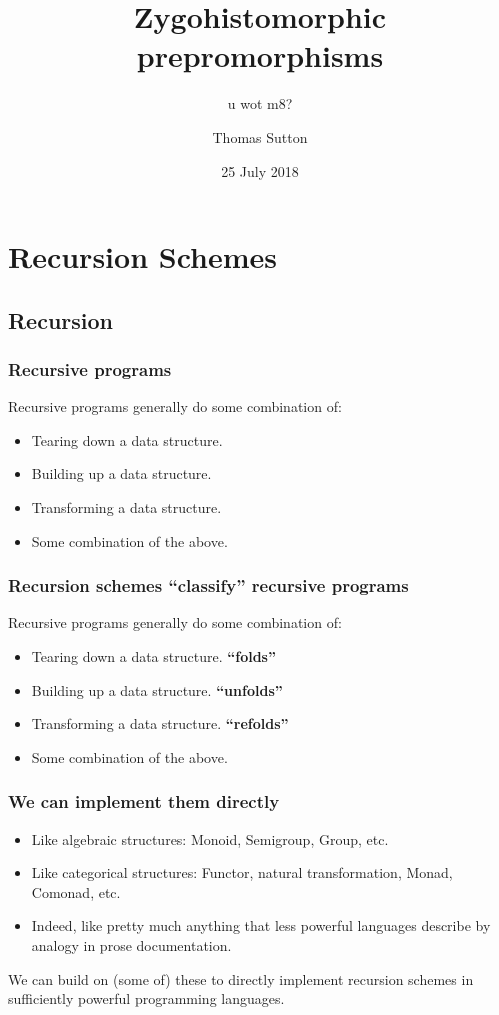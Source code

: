 \documentclass{beamer}
\title{Zygohistomorphic prepromorphisms}
\author{Thomas Sutton}
\institute{Simple Machines}
\date{25 July 2018}
\begin{document}
\begin{frame}
\titlepage
\end{frame}

\subtitle{u wot m8?}

\begin{frame}
\titlepage
\end{frame}


\section{Recursion Schemes}

\subsection{Recursion}

\begin{frame}
\frametitle{Recursive programs}

Recursive programs generally do some combination of:

\begin{itemize}
\item Tearing down a data structure.
\item Building up a data structure.
\item Transforming a data structure.
\item Some combination of the above.
\end{itemize}
\end{frame}

\begin{frame}
\frametitle{Recursion schemes ``classify'' recursive programs}

Recursive programs generally do some combination of:

\begin{itemize}
\item Tearing down a data structure. {\bf ``folds''}
\item Building up a data structure. {\bf ``unfolds''}
\item Transforming a data structure. {\bf ``refolds''}
\item Some combination of the above.
\end{itemize}
\end{frame}

\begin{frame}
\frametitle{We can implement them directly}

\begin{itemize}
\item Like algebraic structures: Monoid, Semigroup, Group, etc.

\item Like categorical structures: Functor, natural transformation, Monad,
  Comonad, etc.

\item Indeed, like pretty much anything that less powerful languages describe
  by analogy in prose documentation.
\end{itemize}

We can build on (some of) these to directly implement recursion schemes in
sufficiently powerful programming languages.
\end{frame}
\end{document}

